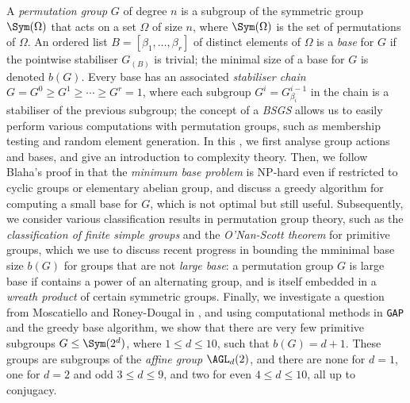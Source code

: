 A \textit{permutation group} $G$ of degree $n$ is a subgroup of the symmetric group $\Sym(\Omega)$ that acts on a set $\Omega$ of size $n$, where $\Sym(\Omega)$ is the set of permutations of $\Omega$. An ordered list $B = [\beta_1,\dotsc,\beta_r]$ of distinct elements of $\Omega$ is a \textit{base} for $G$ if the pointwise stabiliser $G_{(B)}$ is trivial; the minimal size of a base for $G$ is denoted $b(G)$. Every base has an associated \textit{stabiliser chain} $G = G^0 \geq G^1 \geq \dotsb \geq G^r = 1$, where each subgroup $G^i = G^{i-1}_{\beta_i}$ in the chain is a stabiliser of the previous subgroup; the concept of a \textit{BSGS} allows us to easily perform various computations with permutation groups, such as membership testing and random element generation. In this \thesis{}, we first analyse group actions and bases, and give an introduction to complexity theory. Then, we follow Blaha's proof in \cite{blaha1992} that the \textit{minimum base problem} is NP-hard even if restricted to cyclic groups or elementary abelian group, and discuss a greedy algorithm for computing a small base for $G$, which is not optimal but still useful. Subsequently, we consider various classification results in permutation group theory, such as the \textit{classification of finite simple groups} and the \textit{O'Nan-Scott theorem} for primitive groups, which we use to discuss recent progress in bounding the mminimal base size $b(G)$ for groups that are not \textit{large base}: a permutation group $G$ is large base if contains a power of an alternating group, and is itself embedded in a \textit{wreath product} of certain symmetric groups. Finally, we investigate a question from Moscatiello and Roney-Dougal in \cite{moscatiello_roney-dougal2021}, and using computational methods in \texttt{GAP} and the greedy base algorithm, we show that there are very few primitive subgroups $G \leq \Sym(2^d)$, where $1 \leq d \leq 10$, such that $b(G) = d + 1$. These groups are subgroups of the \textit{affine group} $\AGL_d(2)$, and there are none for $d = 1$, one for $d = 2$ and odd $3 \leq d \leq 9$, and two for even $4 \leq d \leq 10$, all up to conjugacy.
